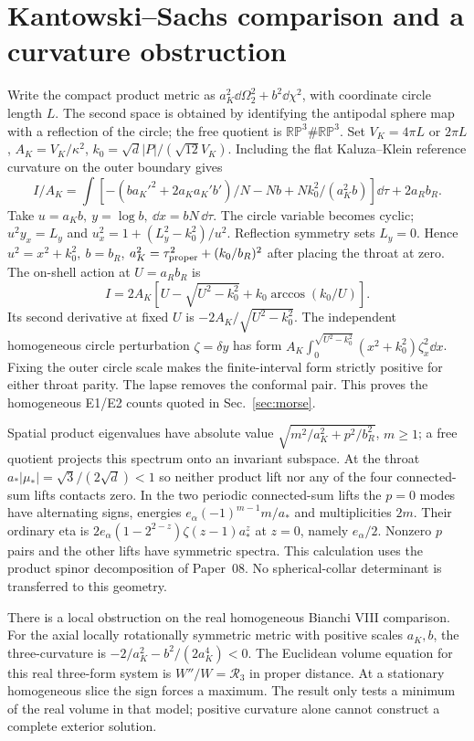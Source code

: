 \section{Kantowski--Sachs comparison and a curvature obstruction}\label{app:ks}
Write the compact product metric as $a_K^2\dd\Omega_2^2+b^2\dd\chi^2$, with coordinate circle length $L$. The second space is obtained by identifying the antipodal sphere map with a reflection of the circle; the free quotient is $\mathbb{RP}^3\#\mathbb{RP}^3$. Set $V_K=4\pi L$ or $2\pi L$, $A_K=V_K/\kappa^2$, $k_0=\sqrt d |P|/(\sqrt{12}V_K)$. Including the flat Kaluza--Klein reference curvature on the outer boundary gives
\[
 I/A_K=\int\left[-(b a_K'^2+2a_Ka_K'b')/N-Nb+
               Nk_0^2/(a_K^2 b)\right]\dd\tau+2a_R b_R .
\]
Take $u=a_K b,\ y=\log b,\ \dd x=bN\,\dd\tau$. The circle variable becomes cyclic; $u^2y_x=L_y$ and $u_x^2=1+(L_y^2-k_0^2)/u^2$. Reflection symmetry sets $L_y=0$. Hence $u^2=x^2+k_0^2,\ b=b_R$, $a_K^2=\tau_{\rm proper}^2+(k_0/b_R)^2$ after placing the throat at zero. The on-shell action at $U=a_Rb_R$ is
\[
 I=2A_K[U-\sqrt{U^2-k_0^2}+k_0\arccos(k_0/U)] .
\]
Its second derivative at fixed $U$ is $-2A_K/\sqrt{U^2-k_0^2}$. The independent homogeneous circle perturbation $\zeta=\delta y$ has form $A_K\int_0^{\sqrt{U^2-k_0^2}}(x^2+k_0^2)\zeta_x^2\dd x$. Fixing the outer circle scale makes the finite-interval form strictly positive for either throat parity. The lapse removes the conformal pair. This proves the homogeneous E1/E2 counts quoted in Sec.~\ref{sec:morse}.

Spatial product eigenvalues have absolute value $\sqrt{m^2/a_K^2+p^2/b_R^2}$, $m\ge1$; a free quotient projects this spectrum onto an invariant subspace. At the throat $a_*|\mu_*|=\sqrt3/(2\sqrt d)<1$ so neither product lift nor any of the four connected-sum lifts contacts zero. In the two periodic connected-sum lifts the $p=0$ modes have alternating signs, energies $e_\alpha(-1)^{m-1}m/a_*$ and multiplicities $2m$. Their ordinary eta is $2e_\alpha(1-2^{2-z})\zeta(z-1)a_*^z$ at $z=0$, namely $e_\alpha/2$. Nonzero $p$ pairs and the other lifts have symmetric spectra. This calculation uses the product spinor decomposition of Paper~08. No spherical-collar determinant is transferred to this geometry.

There is a local obstruction on the real homogeneous Bianchi VIII comparison. For the axial locally rotationally symmetric metric with positive scales $a_K,b$, the three-curvature is $-2/a_K^2-b^2/(2a_K^4)<0$. The Euclidean volume equation for this real three-form system is $W''/W=\mathcal R_3$ in proper distance. At a stationary homogeneous slice the sign forces a maximum. The result only tests a minimum of the real volume in that model; positive curvature alone cannot construct a complete exterior solution.
